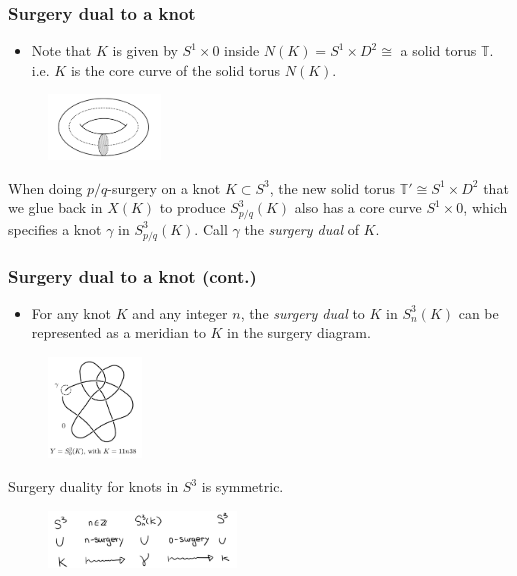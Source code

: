 \documentclass{beamer}
\theoremstyle{ex}
\theoremstyle{rem}
\begin{document}
\begin{frame}
	\frametitle{Surgery dual to a knot}
	\begin{itemize}
		\item Note that $K$ is given by $S^1 \times {0}$ inside $N(K) = S^1 \times D^2 \cong$ a solid torus $\mathbb{T}$. i.e. $K$ is the core curve of the solid torus $N(K)$. 
	\end{itemize}
	\begin{figure}
		\centering
		\includegraphics[width=30mm]{core.png}
	\end{figure}
	\begin{definition}
		When doing $p/q$-surgery on a knot $K \subset S^3$, the new solid torus $\mathbb{T'} \cong S^1 \times D^2$ that we glue back in $X(K)$ to produce $S^3_{p/q}(K)$ also has a core curve $S^1 \times {0}$, which specifies a knot $\gamma$ in $S^3_{p/q}(K)$. Call $\gamma$ the \textit{surgery dual} of $K$.
	\end{definition}		
\end{frame}

\begin{frame}
	\frametitle{Surgery dual to a knot (cont.)}
	\begin{itemize} 
		\item For any knot $K$ and any integer $n$, the \textit{surgery dual} to $K$ in $S^3_n(K)$ can be represented as a meridian to $K$ in the surgery diagram. 
	\end{itemize}
	\begin{figure}
		\centering
		\includegraphics[width=25mm]{dual.png}
	\end{figure}
	\begin{lemma}
		Surgery duality for knots in $S^3$ is symmetric. 
	\end{lemma}
	\begin{figure}
		\centering
		\includegraphics[width=50mm]{Symmetry.jpg}
	\end{figure}
\end{frame}
\end{document}
